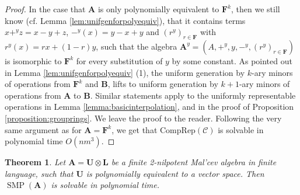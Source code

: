 \documentclass[11pt]{amsart}
\theoremstyle{plain}
\newtheorem{theorem}[thm]{Theorem}
\theoremstyle{definition}
\newcommand{\F}{{\mathbf F}}
\newcommand{\alg}[1]{\mathbf{#1}}
\newcommand{\clonoid}[1]{\mathcal{#1}}
\newcommand{\clodC}{\clonoid{C}}
\newcommand{\algA}{\alg{A}}
\newcommand{\algB}{\alg{B}}
\newcommand{\algL}{\alg{L}}
\newcommand{\algU}{\alg{U}}
\DeclareMathOperator{\SMP}{SMP}
\begin{document}
\begin{proof}
In the case that $\algA$ is only polynomially equivalent to $\F^k$, then we still know (cf. Lemma \ref{lem:unifgenforpolyequiv}), that it contains terms $x+^y z = x-y+z$, $-^y( x) = y-x+y$ and $(r^y)_{r \in \F}$ with $r^y(x) = rx + (1-r)y$, such that the algebra $\algA^{y} = (A,+^y,y,-^y,(r^y)_{r \in \F})$ is isomorphic to $\F^k$ for every substitution of $y$ by some constant. As pointed out in Lemma \ref{lem:unifgenforpolyequiv} (1), the uniform generation by $k$-ary minors of operations from $\F^k$ and $\algB$, lifts to uniform generation by $k+1$-ary minors of operations from $\algA$ to $\algB$. Similar statements apply to the uniformly representable operations in Lemma \ref{lemma:basicinterpolation}, and in the proof of Proposition \ref{proposition:grouprings}. We leave the proof to the reader. Following the very same argument as for $\algA=\F^k$, we get that $\mathrm{CompRep}(\clodC)$ is solvable in polynomial time $O(nm^3)$.
\end{proof}

\begin{theorem}
Let $\algA = \algU \otimes \algL$ be a finite 2-nilpotent Mal'cev algebra in finite language, such that $\algU$ is polynomially equivalent to a vector space. Then $\SMP(\algA)$ is solvable in polynomial time.
\end{theorem}
\end{document}
